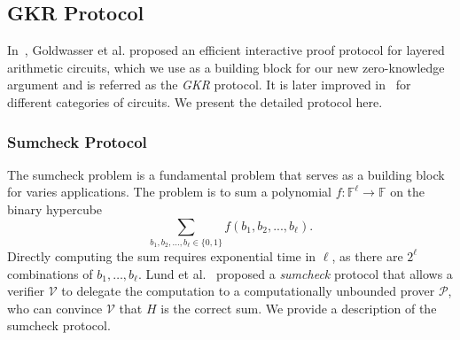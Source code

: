 
\subsection{GKR Protocol}\label{subsec::GKR}

In~\cite{GKR}, Goldwasser et al. proposed an efficient interactive proof protocol for layered arithmetic circuits, which we use as a building block for our new zero-knowledge argument and is referred as the \emph{GKR} protocol. It is later improved in~\cite{CMT,t13, wahby2017full,vram} for different categories of circuits. We present the detailed protocol here.



\subsubsection{Sumcheck Protocol}
\label{subsec::sumcheck}
The sumcheck problem is a fundamental problem that serves as a building block for varies applications. The problem is to sum a polynomial $f: \mathbb{F}^\ell \rightarrow \mathbb{F}$ on the binary hypercube $$\sum\limits_{b_1,b_2,\ldots,b_\ell\in\{0,1\}}f(b_1,b_2,...,b_\ell).$$ 
Directly computing the sum requires exponential time in $\ell$, as there are $2^\ell$ combinations of $b_1,\ldots,b_\ell$. Lund et al.~\cite{sumcheck} proposed a \emph{sumcheck} protocol that allows a verifier $\mathcal{V}$ to delegate the computation to a computationally unbounded prover $\mathcal{P}$, who can convince $\mathcal{V}$ that $H$ is the correct sum. We provide a description of the sumcheck protocol.
\begin{figure}[t!]
\small{
}
\end{figure}
